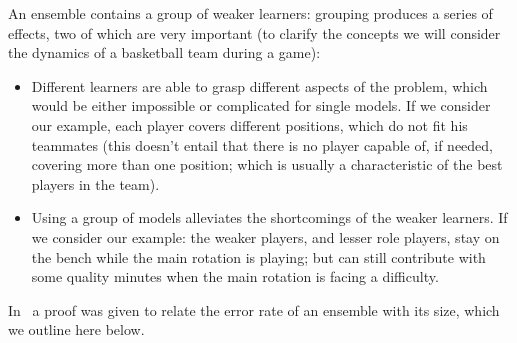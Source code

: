An ensemble contains a group of weaker learners: grouping produces a series of effects, two of which are
very important (to clarify the concepts we will consider the dynamics of a basketball team during a
game):
\begin{itemize}
	\item Different learners are able to grasp different aspects of the problem, which would be
		either impossible or complicated for single models. If we consider our example, each
		player covers different positions, which do not fit his teammates (this doesn't
		entail that there is no player capable of, if needed, covering more than one
		position; which is usually a characteristic of the best players in the team).
	\item Using a group of models alleviates the shortcomings of the weaker learners. If we consider our example: the weaker players, and lesser role players, stay on the bench while the main rotation is playing; but can still contribute with some quality minutes when the main rotation is facing a difficulty.
\end{itemize}

In~\cite{ZhouZhi-Hua2021ML} a proof was given to relate the error rate of an ensemble with its size,
which we outline here below.

